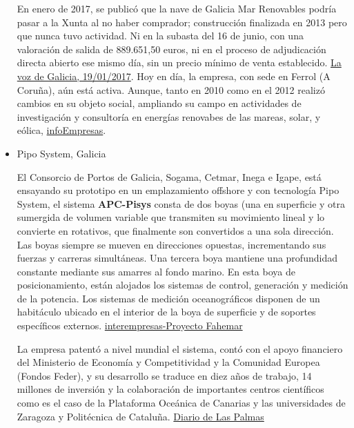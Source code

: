 \documentclass[]{article}
\begin{document}
\begin{itemize}
  En enero de 2017, se publicó que la nave de Galicia Mar Renovables
  podría pasar a la Xunta al no haber comprador; construcción finalizada
  en 2013 pero que nunca tuvo actividad. Ni en la subasta del 16 de
  junio, con una valoración de salida de 889.651,50 euros, ni en el
  proceso de adjudicación directa abierto ese mismo día, sin un precio
  mínimo de venta establecido.
  \href{https://www.lavozdegalicia.es/noticia/ferrol/carino/2017/01/19/nave-galicia-mar-carino-pasar-xunta-haber-comprador/0003_201701F19C7994.htm}{La
  voz de Galicia, 19/01/2017}. Hoy en día, la empresa, con sede en
  Ferrol (A Coruña), aún está activa. Aunque, tanto en 2010 como en el
  2012 realizó cambios en su objeto social, ampliando su campo en
  actividades de investigación y consultoría en energías renovabes de
  las mareas, solar, y eólica,
  \href{https://www.infoempresa.com/es-es/es/empresa/galicia-mar-renovables-sl}{infoEmpresas}.
\item
  Pipo System, Galicia

  El Consorcio de Portos de Galicia, Sogama, Cetmar, Inega e Igape, está
  ensayando su prototipo en un emplazamiento offshore y con tecnología
  Pipo System, el sistema \textbf{APC-Pisys} consta de dos boyas (una en
  superficie y otra sumergida de volumen variable que transmiten su
  movimiento lineal y lo convierte en rotativos, que finalmente son
  convertidos a una sola dirección. Las boyas siempre se mueven en
  direcciones opuestas, incrementando sus fuerzas y carreras
  simultáneas. Una tercera boya mantiene una profundidad constante
  mediante sus amarres al fondo marino. En esta boya de posicionamiento,
  están alojados los sistemas de control, generación y medición de la
  potencia. Los sistemas de medición oceanográficos disponen de un
  habitáculo ubicado en el interior de la boya de superficie y de
  soportes específicos externos.
  \href{http://www.interempresas.net/Energia/Articulos/126331-Generar-energia-a-partir-de-energia-undimotriz.html}{interempresas-Proyecto
  Fahemar}

  La empresa patentó a nivel mundial el sistema, contó con el apoyo
  financiero del Ministerio de Economía y Competitividad y la Comunidad
  Europea (Fondos Feder), y su desarrollo se traduce en diez años de
  trabajo, 14 millones de inversión y la colaboración de importantes
  centros científicos como es el caso de la Plataforma Oceánica de
  Canarias y las universidades de Zaragoza y Politécnica de Cataluña.
  \href{http://www.laprovincia.es/sociedad/2012/10/21/carrera-boya-inteligente/491794.html}{Diario
  de Las Palmas}


\end{itemize}
\end{document}
